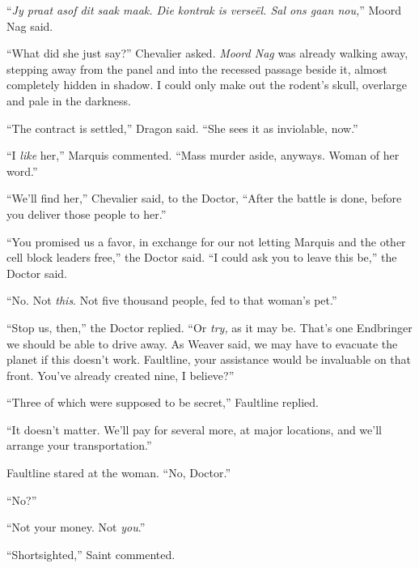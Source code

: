 ``\emph{Jy praat asof dit saak maak. Die kontrak is verse\"{e}l. Sal ons gaan nou,}'' Moord Nag said.



``What did she just say?'' Chevalier asked.  \emph{Moord Nag }was already walking away, stepping away from the panel and into the recessed passage beside it, almost completely hidden in shadow.  I could only make out the rodent's skull, overlarge and pale in the darkness.



``The contract is settled,'' Dragon said.  ``She sees it as inviolable, now.''



``I \emph{like} her,'' Marquis commented.  ``Mass murder aside, anyways.  Woman of her word.''



``We'll find her,'' Chevalier said, to the Doctor, ``After the battle is done, before you deliver those people to her.''



``You promised us a favor, in exchange for our not letting Marquis and the other cell block leaders free,'' the Doctor said.  ``I could ask you to leave this be,'' the Doctor said.



``No.  Not \emph{this}.  Not five thousand people, fed to that woman's pet.''



``Stop us, then,'' the Doctor replied.  ``Or \emph{try, }as it may be.  That's one Endbringer we should be able to drive away.  As Weaver said, we may have to evacuate the planet if this doesn't work.  Faultline, your assistance would be invaluable on that front.  You've already created nine, I believe?''



``Three of which were supposed to be secret,'' Faultline replied.



``It doesn't matter.  We'll pay for several more, at major locations, and we'll arrange your transportation.''



Faultline stared at the woman.  ``No, Doctor.''



``No?''



``Not your money.  Not \emph{you}.''



``Shortsighted,'' Saint commented.




